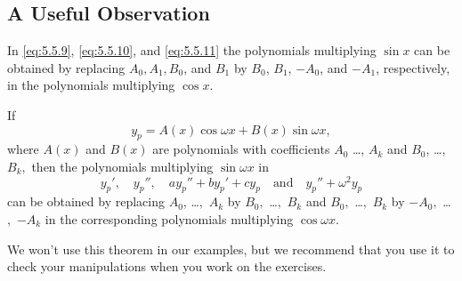 \documentclass{ximera}
\begin{document}
\subsection*{A Useful Observation}

In \eqref{eq:5.5.9}, \eqref{eq:5.5.10}, and \eqref{eq:5.5.11} the polynomials
multiplying $\sin x$ can be obtained by replacing $A_0,A_1,B_0$,
and $B_1$ by $B_0$, $B_1$, $-A_0$, and $-A_1$, respectively, in the
polynomials multiplying $\cos x$. %

\begin{theorem}\label{thmtype:5.5.2}
If
$$
y_p=A(x)\cos\omega x+B(x)\sin\omega x,
$$
where $A(x)$ and $B(x)$ are polynomials with coefficients
$A_0$ \dots, $A_k$ and $B_0$, \dots, $B_k,$ then the polynomials
multiplying $\sin\omega x$ in
$$
y_p',\quad y_p'',\quad  ay_p''+by_p'+cy_p
\quad\mbox{and}\quad y_p''+\omega^2 y_p
$$
can be obtained by replacing $A_0$, \dots$,$ $A_k$ by $B_0,$ \dots$,$ $B_k$
and $B_0,$ \dots$,$  $B_k$ by $-A_0,$ \dots$,$ $-A_k$ in the corresponding
polynomials multiplying $\cos\omega x$.
\end{theorem}

We won't use this theorem in our examples, but we recommend that
you use it to check your manipulations when you work on the  exercises.
\end{document}
